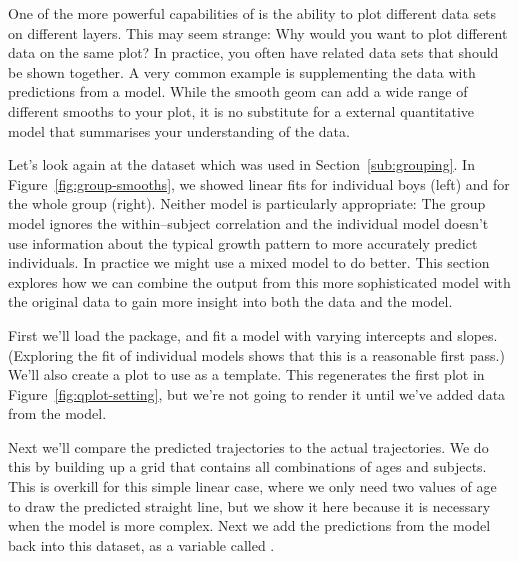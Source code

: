 One of the more powerful capabilities of \ggplot is the ability to plot different data sets on different layers.  This may seem strange: Why would you want to plot different data on the same plot?  In practice, you often have related data sets that should be shown together.  A very common example is supplementing the data with predictions from a model.  While the smooth geom can add a wide range of different smooths to your plot, it is no substitute for a external quantitative model that summarises your understanding of the data.

Let's look again at the  dataset which was used in Section~\ref{sub:grouping}.  In Figure~\ref{fig:group-smooths}, we showed linear fits for individual boys (left) and for the whole group (right).  Neither model is particularly appropriate: The group model ignores the within--subject correlation and the individual model doesn't use information about the typical growth pattern to more accurately predict individuals.  In practice we might use a mixed model to do better.  This section explores how we can combine the output from this more sophisticated model with the original data to gain more insight into both the data and the model.

First we'll load the  package, and fit a model with varying intercepts and slopes.  (Exploring the fit of individual models shows that this is a reasonable first pass.)  We'll also create a plot to use as a template.  This regenerates the first plot in Figure~\ref{fig:qplot-setting}, but we're not going to render it until we've added data from the model.

% 


Next we'll compare the predicted trajectories to the actual trajectories.  We do this by building up a grid that contains all combinations of ages and subjects.  This is overkill for this simple linear case, where we only need two values of age to draw the predicted straight line, but we show it here because it is necessary when the model is more complex.  Next we add the predictions from the model back into this dataset, as a variable called .  

% 
% 


